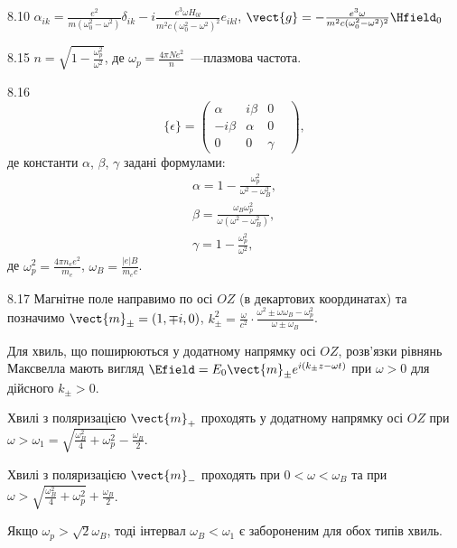 \protect \section *{\protect {}}
\begin{Solution}{8.{10}}
	$\alpha_{ik} = \frac{e^2}{m(\omega_0^2 - \omega^2)}\delta_{ik} - i \frac{e^3\omega H_{0l}}{m^2c(\omega_0^2 - \omega^2)^2}e_{ikl}$, $\vect{g} = -\frac{e^3\omega}{m^2c(\omega_0^2 - \omega^2)^2}\Hfield_0$
\end{Solution}
\begin{Solution}{8.{15}}
	$n = \sqrt{1 - \frac{\omega_p^2}{\omega^2}}$, де $\omega_p = \frac{4\pi N e^2}{n}$~---плазмова частота.
\end{Solution}
\begin{Solution}{8.{16}}
	\begin{equation*}
		\{ \epsilon \}  = \left( {\begin{array}{*{20}{c}}
				\alpha       & {i\beta } & 0      & \\
				{ - i\beta } & \alpha    & 0      & \\
				0            & 0         & \gamma &
			\end{array}} \right),
	\end{equation*}
	де константи $\alpha$, $\beta$, $\gamma$ задані формулами:
	\begin{align*}
		\alpha =  1 - \frac{\omega_p^2}{\omega ^2 - \omega _B^2},           \\
		\beta = \frac{\omega_B\omega_p^2}{\omega(\omega ^2 - \omega _B^2)}, \\
		\gamma = 1 - \frac{\omega _p^2}{\omega ^2},
	\end{align*}
	де $\omega _p^2 = \frac{4\pi n_e e^2}{m_e}$, $\omega_B = \frac{\left| e \right|B}{m_ec}$.
\end{Solution}
\begin{Solution}{8.{17}}
    Магнітне поле направимо по осі $OZ$ (в декартових координатах) та позначимо \(\vect{m}_{\pm} = (1, \mp i,0)\), \(k_\pm^2 = \frac{\omega }{c^2} \cdot \frac{\omega^2 \pm \omega \omega_B - \omega_p^2}{\omega  \pm \omega_B}\).

    Для хвиль, що поширюються у додатному напрямку осі $OZ$, розв’язки рівнянь Максвелла мають вигляд $\Efield = E_0\vect{m}_{\pm} e^{i(k_\pm z - \omega t)}$ при $\omega > 0$ для дійсного $k_{\pm} >0$.

    Хвилі з поляризацією $\vect{m}_+$ проходять у додатному напрямку осі $OZ$ при \(\omega  > \omega_1 = \sqrt {\frac{{\omega_B^2}}{4} + \omega_p^2}  - \frac{\omega _B}{2}\).

    Хвилі з поляризацією $\vect{m}_-$ проходять при \(0<\omega<\omega_B\)  та при\\\(\omega  > \sqrt {\frac{\omega_B^2}{4} + \omega_p^2}  + \frac{\omega _B}{2}\).

    Якщо \({\omega _p} > \sqrt 2 {\omega _B}\), тоді  інтервал \(\omega_B  <  \omega_1 \)  є забороненим для обох типів хвиль.
\end{Solution}
